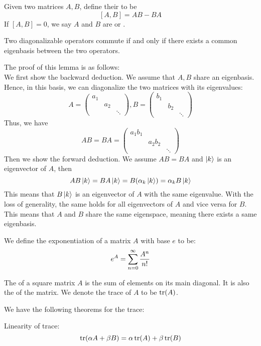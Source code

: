 \label{subsec:commutator}
\begin{definition}
    Given two matrices $A, B$, define their  to be
    $$[A, B] = AB - BA$$
    If $[A,B] = 0$, we say $A$ and $B$ are  or . 
\end{definition}
\begin{lemma}
    Two diagonalizable operators commute if and only if there exists a common eigenbasis between the two operators.
\end{lemma}
The proof of this lemma is as follows: \\
We first show the backward deduction. We assume that $A, B$ share an eigenbasis. Hence, in this basis, we can diagonalize the two matrices with its eigenvalues:
$$A = \begin{pmatrix}
    a_1 &  & \\
    & a_2 & \\
    & & \ddots
\end{pmatrix}, B = \begin{pmatrix}
    b_1 &  & \\
    & b_2 & \\
    & & \ddots
\end{pmatrix}$$
Thus, we have
$$AB = BA = \begin{pmatrix}
    a_1b_1 &  & \\
    & a_2b_2 & \\
    & & \ddots
\end{pmatrix}$$
Then we show the forward deduction. We assume $AB=BA$ and $\ket{k}$ is an eigenvector of $A$, then
$$AB\ket{k} = BA\ket{k} = B(\alpha_k \ket{k}) = \alpha_k B\ket{k}$$
This means that $B\ket{k}$ is an eigenvector of $A$ with the same eigenvalue. With the loss of generality, the same holds for all eigenvectors of $A$ and vice versa for $B$. This means that $A$ and $B$ share the same eigenspace, meaning there exists a same eigenbasis.
\begin{theorem}
    We define the exponentiation of a matrix $A$ with base $e$ to be:
    $$e^A = \sum_{n = 0}^{\infty} \frac{A^n}{n!}$$
\end{theorem}
\begin{definition}
    The  of a square matrix $A$ is the sum of elements on its main diagonal. It is also the  of the matrix. We denote the trace of $A$ to be $\tr(A)$.
\end{definition}
We have the following theorems for the trace:
\begin{theorem}
    Linearity of trace:
    $$\tr(\alpha A + \beta B) = \alpha \tr(A) + \beta \tr(B)$$
\end{theorem}
